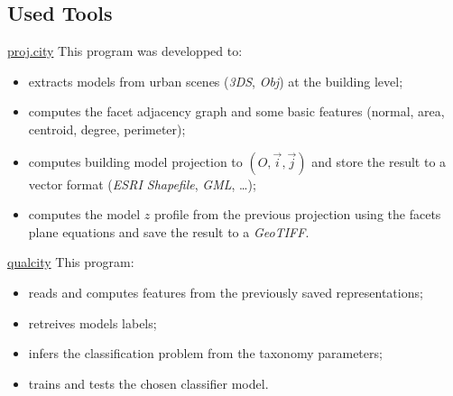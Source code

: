 \documentclass{beamer}
\begin{document}
        \subsection{Used Tools}
            \begin{frame}{\href{https://github.com/ethiy/proj.city}{proj.city}}
                This program was developped to:
                \begin{itemize}[label=$\blacktriangleright$, font=\color{IGNGreen}]
                    \item<1-> extracts models from urban scenes (\emph{3DS}, \emph{Obj}) at the building level;
                    \item<2-> computes the facet adjacency graph and some basic features (normal, area, centroid, degree, perimeter);
                    \item<3-> computes building model projection to $(O, \vec{i}, \vec{j})$ and store the result to a vector format (\emph{ESRI Shapefile}, \emph{GML}, \dots);
                    \item<4-> computes the model $z$ profile from the previous projection using the facets plane equations and save the result to a \emph{GeoTIFF}.
                \end{itemize}
            \end{frame}
            \begin{frame}{\href{https://github.com/ethiy/qualcity}{qualcity}}
                This program:
                \begin{itemize}[label=$\blacktriangleright$, font=\color{IGNGreen}]
                    \item<1-> reads and computes features from the previously saved representations;
                    \item<2-> retreives models labels;
                    \item<3-> infers the classification problem from the taxonomy parameters;
                    \item<3-> trains and tests the chosen classifier model.
                \end{itemize}
            \end{frame}
\end{document}
